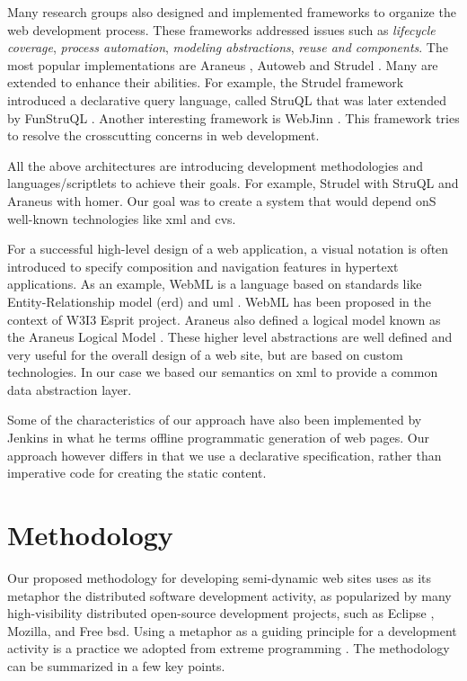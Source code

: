 \documentclass[10pt]{article}
\begin{document}
Many research groups also designed and implemented frameworks to organize the web development process. These frameworks addressed issues
such as {\em lifecycle coverage}, {\em process automation}, {\em modeling abstractions}, {\em reuse and components}. The most popular implementations are 
Araneus \cite{MAM03}, 
Autoweb \cite{FP00} and Strudel \cite{FFLS00}. Many are extended to enhance their abilities. For example, the Strudel
framework introduced a declarative query language, called StruQL that was later extended by FunStruQL \cite{FST99}. Another interesting
framework is WebJinn \cite{KL03}. This framework tries to resolve the crosscutting concerns in web development.

All the above architectures are introducing development methodologies and languages/scriptlets to achieve their goals. For example, Strudel with StruQL
and Araneus with homer. Our goal was to create a system
that would depend onS well-known technologies like {\sc xml} and {\sc cvs}.

For a successful high-level design of a web application,
a visual notation is often introduced to specify composition and navigation features in
hypertext applications.
As an example, {\sc WebML} \cite{CFB00,WEBML} is a language based on standards like Entity-Relationship model {\sc (erd)} and {\sc uml} \cite{UML}.
{\sc WebML} has been proposed in the context of {\sc W3I3} Esprit project.
Araneus also defined a logical model known as the Araneus Logical Model \cite{MAM03}.
These higher level abstractions are well defined and very useful for the overall design of a web site, but are based on custom technologies.
In our case we based our semantics on {\sc xml} to provide a common data abstraction layer.

Some of the characteristics of our approach have also been implemented by
Jenkins \cite{Jen04} in what he terms
offline programmatic generation of web pages.
Our approach however differs in that we use a declarative specification,
rather than imperative code for creating the static content.

\section{Methodology}
\label{sec:meth}
Our proposed methodology for developing semi-dynamic web sites uses as
its metaphor the distributed software development activity, as popularized
by many high-visibility distributed open-source development projects,
such as Eclipse \cite{GB04}, Mozilla, and Free {\sc bsd}.
Using a metaphor as a guiding principle for a development activity
is a practice we adopted from extreme programming \cite{Bec00}.
The methodology can be summarized in a few key points.
\end{document}
